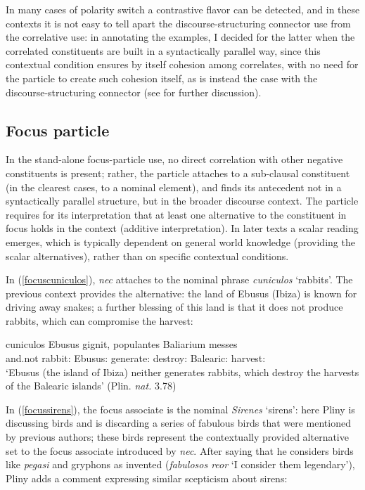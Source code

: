 \documentclass[output=paper,modfonts,nonflat,citecolor=brown,
showindex
]{langsci/langscibook}
\begin{document}
In many cases of polarity switch a contrastive flavor can be detected, and in these contexts it is not easy to tell apart the discourse-structuring connector use from the correlative use: in annotating the examples, I decided for the latter when the correlated constituents are built in a syntactically parallel way, since this contextual condition ensures by itself cohesion among correlates, with no need for the particle to create such cohesion itself, as is instead the case with the discourse-structuring connector (see \citealt[]{OrlandiniPoccetti07} for further discussion). 

\subsection{Focus particle} \label{functionfocusparticle}

In the stand-alone focus-particle use, no direct correlation with other negative constituents is present; rather, the particle attaches to a sub-clausal constituent (in the clearest cases, to a nominal element), and finds its antecedent not in a syntactically parallel structure, but in the broader discourse context. The particle requires for its interpretation that at least one alternative to the constituent in focus holds in the context (additive interpretation). In later texts a scalar reading emerges, which is typically dependent on general world knowledge (providing the scalar alternatives), rather than on specific contextual conditions. 

In (\ref{focuscuniculos}), {\em{nec}} attaches to the nominal phrase {\em{cuniculos}} `rabbits'. The previous context provides the alternative: the land of Ebusus (Ibiza) is known for driving away snakes; a further blessing of this land is that it does not produce rabbits, which can compromise the harvest: 

{\begin{exe}
\ex \label{focuscuniculos}  cuniculos Ebusus gignit, populantes Baliarium messes\\
and.not rabbit:{} Ebusus:{} generate:{} destroy:{} Balearic:{} harvest:{}\\

`Ebusus (the island of Ibiza) neither generates rabbits, which destroy the harvests of the Balearic islands' (Plin. {\em{nat.}} 3.78)
\end{exe}}

\noindent In (\ref{focussirens}), the focus associate is the nominal {\em{Sirenes}} `sirens': here Pliny is discussing birds and is discarding a series of fabulous birds that were mentioned by previous authors; these birds represent the contextually provided alternative set to the focus associate introduced by {\em{nec}}. After saying that he considers birds like {\em{pegasi}} and gryphons as invented ({\em{fabulosos reor}} `I consider them legendary'), Pliny adds a comment expressing similar scepticism about sirens:
\end{document}
